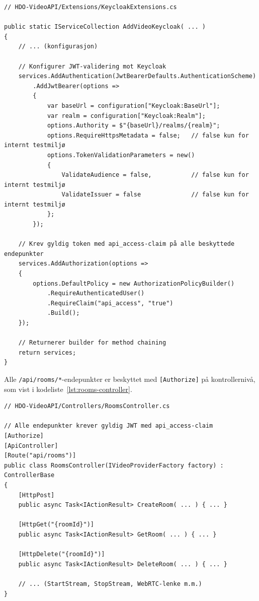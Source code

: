 \begin{lstlisting}[language={[Sharp]C}, label=lst:keycloak-extensions, caption={\texttt{KeycloakExtensions.cs} – JWT-validering og autorisasjonspolicy}]
// HDO-VideoAPI/Extensions/KeycloakExtensions.cs

public static IServiceCollection AddVideoKeycloak( ... )
{
    // ... (konfigurasjon)
    
    // Konfigurer JWT-validering mot Keycloak
    services.AddAuthentication(JwtBearerDefaults.AuthenticationScheme)
        .AddJwtBearer(options =>
        {
            var baseUrl = configuration["Keycloak:BaseUrl"];
            var realm = configuration["Keycloak:Realm"];
            options.Authority = $"{baseUrl}/realms/{realm}";
            options.RequireHttpsMetadata = false;   // false kun for internt testmiljø
            options.TokenValidationParameters = new()
            {
                ValidateAudience = false,           // false kun for internt testmiljø
                ValidateIssuer = false              // false kun for internt testmiljø
            };
        });
    
    // Krev gyldig token med api_access-claim på alle beskyttede endepunkter
    services.AddAuthorization(options =>
    {
        options.DefaultPolicy = new AuthorizationPolicyBuilder()
            .RequireAuthenticatedUser()
            .RequireClaim("api_access", "true")
            .Build();
    });

    // Returnerer builder for method chaining
    return services;
}
\end{lstlisting}

Alle \texttt{/api/rooms/*}-endepunkter er beskyttet med \texttt{[Authorize]} på kontrollernivå, som vist i kodeliste~\ref{lst:rooms-controller}.

\begin{lstlisting}[language={[Sharp]C}, label=lst:rooms-controller, caption={\texttt{RoomsController.cs} – beskyttede endepunkter (utdrag)}]
// HDO-VideoAPI/Controllers/RoomsController.cs

// Alle endepunkter krever gyldig JWT med api_access-claim
[Authorize]
[ApiController]
[Route("api/rooms")]
public class RoomsController(IVideoProviderFactory factory) : ControllerBase
{
    [HttpPost]
    public async Task<IActionResult> CreateRoom( ... ) { ... }

    [HttpGet("{roomId}")]
    public async Task<IActionResult> GetRoom( ... ) { ... }

    [HttpDelete("{roomId}")]
    public async Task<IActionResult> DeleteRoom( ... ) { ... }

    // ... (StartStream, StopStream, WebRTC-lenke m.m.)
}
\end{lstlisting}

